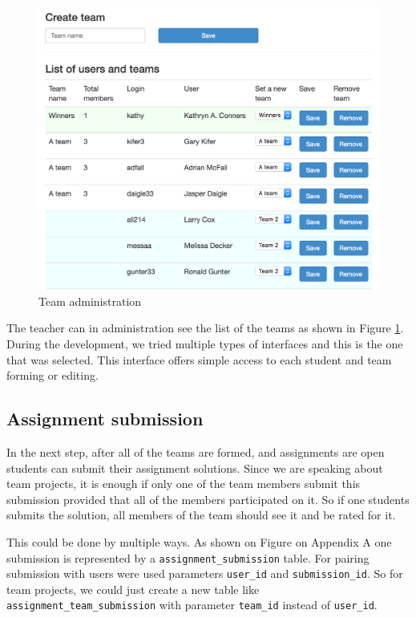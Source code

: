 \begin{figure}[h]
    \centering
    \includegraphics[width=\textwidth]{images/teamadmin.png}
    \caption{Team administration}
    \label{team_forming}
\end{figure}

The teacher can in administration see the list of the teams as shown in Figure \ref{team_forming}. During the development, we tried multiple types of interfaces and this is the one that was selected. This interface offers simple access to each student and team forming or editing.

\subsection{Assignment submission}
In the next step, after all of the teams are formed, and assignments are open students can submit their assignment solutions. Since we are speaking about team projects, it is enough if only one of the team members submit this submission provided that all of the members participated on it. So if one students submits the solution, all members of the team should see it and be rated for it.

This could be done by multiple ways. As shown on Figure on Appendix A one submission is represented by a \texttt{assignment\_submission} table. For pairing submission with users were used parameters \texttt{user\_id} and \texttt{submission\_id}. So for team projects, we could just create a new table like \texttt{assignment\_team\_submission} with parameter \texttt{team\_id} instead of \texttt{user\_id}.

